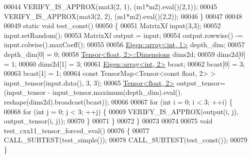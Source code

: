 \begin{DoxyCode}
00044   VERIFY\_IS\_APPROX(mat3(2, 1), (m1*m2).eval()(2,1));
00045   VERIFY\_IS\_APPROX(mat3(2, 2), (m1*m2).eval()(2,2));
00046 \}
00047 
00048 
00049 \textcolor{keyword}{static} \textcolor{keywordtype}{void} test\_const()
00050 \{
00051   MatrixXf input(3,3);
00052   input.setRandom();
00053   MatrixXf output = input;
00054   output.rowwise() -= input.colwise().maxCoeff();
00055 
00056   \hyperlink{class_eigen_1_1array}{Eigen::array<int, 1>} depth\_dim;
00057   depth\_dim[0] = 0;
00058   \hyperlink{class_eigen_1_1_tensor}{Tensor<float, 2>::Dimensions} dims2d;
00059   dims2d[0] = 1;
00060   dims2d[1] = 3;
00061   \hyperlink{class_eigen_1_1array}{Eigen::array<int, 2>} bcast;
00062   bcast[0] = 3;
00063   bcast[1] = 1;
00064   \textcolor{keyword}{const} TensorMap<Tensor<const float, 2> > input\_tensor(input.data(), 3, 3);
00065   \hyperlink{class_eigen_1_1_tensor}{Tensor<float, 2>} output\_tensor= (input\_tensor - input\_tensor.maximum(depth\_dim).eval().
      reshape(dims2d).broadcast(bcast));
00066 
00067   \textcolor{keywordflow}{for} (\textcolor{keywordtype}{int} i = 0; i < 3; ++i) \{
00068     \textcolor{keywordflow}{for} (\textcolor{keywordtype}{int} j = 0; j < 3; ++j) \{
00069       VERIFY\_IS\_APPROX(output(i, j), output\_tensor(i, j));
00070     \}
00071   \}
00072 \}
00073 
00074 
00075 \textcolor{keywordtype}{void} test\_cxx11\_tensor\_forced\_eval()
00076 \{
00077   CALL\_SUBTEST(test\_simple());
00078   CALL\_SUBTEST(test\_const());
00079 \}
\end{DoxyCode}
